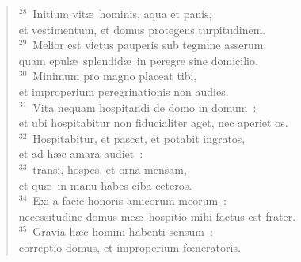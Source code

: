 \begin{flushleft}\begin{verse}${}^{28}$~Initium vit\ae\ hominis, aqua et panis,\\ et vestimentum, et domus protegens turpitudinem.\\
${}^{29}$~Melior est victus pauperis sub tegmine asserum\\ quam epul\ae\ splendid\ae\ in peregre sine domicilio.\\
${}^{30}$~Minimum pro magno placeat tibi,\\ et improperium peregrinationis non audies.\\
${}^{31}$~Vita nequam hospitandi de domo in domum~:\\ et ubi hospitabitur non fiducialiter aget, nec aperiet os.\\
${}^{32}$~Hospitabitur, et pascet, et potabit ingratos,\\ et ad h\ae c amara audiet~:\\
${}^{33}$~transi, hospes, et orna mensam,\\ et qu\ae\ in manu habes ciba ceteros.\\
${}^{34}$~Exi a facie honoris amicorum meorum~:\\ necessitudine domus me\ae\ hospitio mihi factus est frater.\\
${}^{35}$~Gravia h\ae c homini habenti sensum~:\\ correptio domus, et improperium fœneratoris.\end{verse}\end{flushleft}


